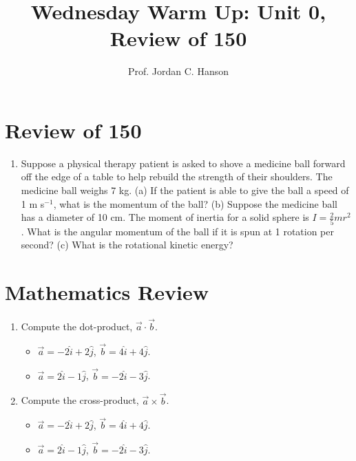 \documentclass{article}
\begin{document}
\twocolumn

\title{Wednesday Warm Up: Unit 0, Review of 150}
\author{Prof. Jordan C. Hanson}

\maketitle

\section{Review of 150}

\begin{enumerate}
\item Suppose a physical therapy patient is asked to shove a medicine ball forward off the edge of a table to help rebuild the strength of their shoulders.  The medicine ball weighs 7 kg.  (a) If the patient is able to give the ball a speed of 1 m s$^{-1}$, what is the momentum of the ball? (b) Suppose the medicine ball has a diameter of 10 cm.  The moment of inertia for a solid sphere is $I = \frac{2}{5} m r^2$.  What is the angular momentum of the ball if it is spun at 1 rotation per second? (c) What is the rotational kinetic energy? \\ \vspace{5cm}
\end{enumerate}
\section{Mathematics Review}
\begin{enumerate}
\item Compute the dot-product, $\vec{a} \cdot \vec{b}$.
\begin{itemize}
\item $\vec{a} = -2\hat{i} + 2\hat{j}$, $\vec{b} = 4\hat{i} + 4\hat{j}$.
\item $\vec{a} = 2\hat{i} - 1\hat{j}$, $\vec{b} = -2\hat{i} - 3\hat{j}$.
\end{itemize}
\item Compute the cross-product, $\vec{a} \times \vec{b}$.
\begin{itemize}
\item $\vec{a} = -2\hat{i} + 2\hat{j}$, $\vec{b} = 4\hat{i} + 4\hat{j}$.
\item $\vec{a} = 2\hat{i} - 1\hat{j}$, $\vec{b} = -2\hat{i} - 3\hat{j}$.
\end{itemize}
\end{enumerate} \vspace{4cm}
\end{document}
